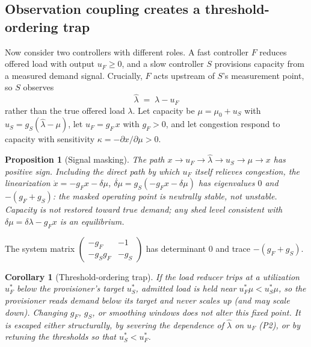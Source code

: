 \documentclass[conference]{IEEEtran}
\newtheorem{proposition}{Proposition}
\newtheorem{corollary}{Corollary}
\begin{document}
\subsection{Observation coupling creates a threshold-ordering trap}

Now consider two controllers with different roles. A fast controller $F$
reduces offered load with output $u_F \geq 0$, and a slow controller $S$
provisions capacity from a measured demand signal. Crucially, $F$ acts
upstream of $S$'s measurement point, so $S$ observes
\[
\hat{\lambda} \;=\; \lambda - u_F
\]
rather than the true offered load $\lambda$. Let capacity be
$\mu = \mu_0 + u_S$ with $u_S = g_S(\hat{\lambda} - \mu)$, let
$u_F = g_F\, x$ with $g_F > 0$, and let congestion respond to capacity with
sensitivity $\kappa = -\partial x / \partial \mu > 0$.

\begin{proposition}[Signal masking]
\label{prop:masking}
The path $x \to u_F \to \hat{\lambda} \to u_S \to \mu \to x$ has positive sign.
Including the direct path by which $u_F$ itself relieves congestion, the
linearization $\dot x = -g_F x - \delta\mu$,
$\dot{\delta\mu} = g_S(-g_F x - \delta\mu)$ has eigenvalues $0$ and
$-(g_F+g_S)$: the masked operating point is neutrally stable, not unstable.
Capacity is not restored toward true demand; any shed level consistent with
$\delta\mu = \delta\lambda - g_F x$ is an equilibrium.
\end{proposition}

\begin{IEEEproof}
The system matrix $\begin{pmatrix}-g_F & -1\\ -g_Sg_F & -g_S\end{pmatrix}$ has
determinant $0$ and trace $-(g_F+g_S)$.
\end{IEEEproof}

\begin{corollary}[Threshold-ordering trap]
\label{cor:detune}
If the load reducer trips at a utilization $u_F^\ast$ below the provisioner's
target $u_S^\ast$, admitted load is held near $u_F^\ast\mu < u_S^\ast\mu$,
so the provisioner reads demand below its target and never scales up (and may
scale down). Changing $g_F$, $g_S$, or smoothing windows does not alter this
fixed point. It is escaped either structurally, by severing the dependence of
$\hat{\lambda}$ on $u_F$ (P2), or by retuning the thresholds so that
$u_S^\ast < u_F^\ast$.
\end{corollary}
\end{document}
